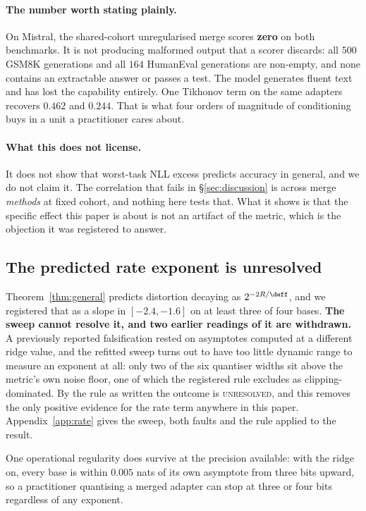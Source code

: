 \paragraph{The number worth stating plainly.} On Mistral, the shared-cohort
unregularised merge scores \textbf{zero} on both benchmarks. It is not
producing malformed output that a scorer discards: all $500$ GSM8K generations
and all $164$ HumanEval generations are non-empty, and none contains an
extractable answer or passes a test. The model generates fluent text and has
lost the capability entirely. One Tikhonov term on the same adapters recovers
$0.462$ and $0.244$. That is what four orders of magnitude of conditioning buys
in a unit a practitioner cares about.

\paragraph{What this does not license.} It does not show that worst-task NLL
excess predicts accuracy in general, and we do not claim it. The correlation
that fails in \S\ref{sec:discussion} is across merge \emph{methods} at fixed
cohort, and nothing here tests that. What it shows is that the specific effect
this paper is about is not an artifact of the metric, which is the objection it
was registered to answer.

\subsection{The predicted rate exponent is unresolved}
\label{subsec:w3}

Theorem~\ref{thm:general} predicts distortion decaying as $2^{-2R/\deff}$,
and we registered that as a slope in $[-2.4, -1.6]$ on at least three of
four bases. \textbf{The sweep cannot resolve it, and two earlier readings
of it are withdrawn.} A previously reported falsification rested on
asymptotes computed at a different ridge value, and the refitted sweep
turns out to have too little dynamic range to measure an exponent at all:
only two of the six quantiser widths sit above the metric's own noise
floor, one of which the registered rule excludes as clipping-dominated.
By the rule as written the outcome is \textsc{unresolved}, and this
removes the only positive evidence for the rate term anywhere in this
paper. Appendix~\ref{app:rate} gives the sweep, both faults and the rule
applied to the result.

One operational regularity does survive at the precision available: with
the ridge on, every base is within $0.005$ nats of its own asymptote from
three bits upward, so a practitioner quantising a merged adapter can stop
at three or four bits regardless of any exponent.

